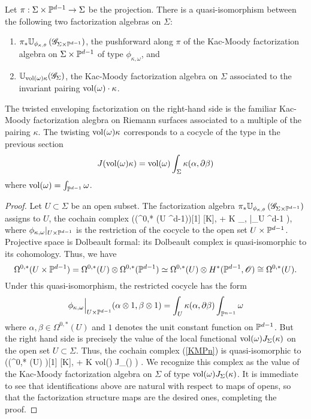 \begin{prop}
Let $\pi : \Sigma \times \mathbb P^{d-1} \to \Sigma$ be the projection. 
There is a quasi-isomorphism between the following two factorization algebras on $\Sigma$:
\begin{enumerate}
\item $\pi_* \mathbb U_{\phi_{\kappa, \theta}} \left(\mathscr G_{\Sigma \times \mathbb P^{d-1}}\right)$, the pushforward along $\pi$ of the Kac-Moody factorization algebra on $\Sigma \times \mathbb P^{d-1}$ of type $\phi_{\kappa,\omega}$, and
\item $\mathbb U_{{\rm vol}(\omega) \kappa} (\mathscr G_\Sigma)$, the Kac-Moody factorization algebra on $\Sigma$ associated to the invariant pairing ${\rm vol}(\omega) \cdot \kappa$. 
\end{enumerate}
\end{prop}

The twisted enveloping factorization on the right-hand side is the familiar Kac-Moody factorization alegbra on Riemann surfaces associated to a multiple of the pairing $\kappa$.
The twisting ${\rm vol}(\omega) \kappa$ corresponds to a cocycle of the type in the previous section 
\[
J({\rm vol}(\omega) \kappa) = {\rm vol}(\omega) \int_\Sigma \kappa(\alpha, \partial \beta)
\]
where ${\rm vol}(\omega) = \int_{\mathbb P^{d-1}} \omega$. 

\begin{proof}
Let $U \subset \Sigma$ be an open subset. 
The factorization algebra $\pi_* \mathbb U_{\phi_{\kappa, \theta}} \left(\mathscr G_{\Sigma \times \mathbb P^{d-1}}\right)$ assigns to $U$, the cochain complex
\beqn\label{KMPn}
\left(\Sym \left(\Omega^{0,*} (U \times \PP^{d-1})\right)[1] [K], \dbar + K \phi_{\kappa, \omega}|_{U \times \PP^{d-1}} \right),
\eeqn
where $\phi_{\kappa, \omega}|_{U \times \mathbb P^{d-1}}$ is the restriction of the cocycle to the open set $U \times \mathbb P^{d-1}$. 
Projective space is Dolbeault formal: its Dolbeault complex is quasi-isomorphic to its cohomology.
Thus, we have 
\[
\Omega^{0,*} (U \times \mathbb P^{d-1}) = \Omega^{0,*}(U) \otimes \Omega^{0,*}(\mathbb P^{d-1}) \simeq \Omega^{0,*}(U) \otimes H^*(\mathbb P^{d-1}, \mathscr O) \cong \Omega^{0,*}(U) .
\]
Under this quasi-isomorphism, the restricted cocycle has the form
\[
\phi_{\kappa,\omega}\Big|_{U \times \mathbb P^{d-1}} (\alpha \otimes 1, \beta \otimes 1) = \int_{U} \kappa(\alpha, \partial \beta) \int_{\mathbb P^{n-1}} \omega 
\]
where $\alpha,\beta \in \Omega^{0,*} (U)$ and $1$ denotes the unit constant function on $\mathbb P^{d-1}$. 
But the right hand side is precisely the value of the local functional ${\rm vol}(\omega) J_\Sigma (\kappa)$ on the open set $U \subset \Sigma$. 
Thus, the cochain complex (\ref{KMPn}) is quasi-isomorphic to 
\beqn
\left(\Sym \left(\Omega^{0,*} (U) \right)[1] [K], \dbar + K {\rm vol}(\omega) J_\Sigma (\kappa) \right) .
\eeqn
We recognize this complex as the value of the Kac-Moody factorization algebra on $\Sigma$ of type ${\rm vol}(\omega) J_\Sigma (\kappa)$.
It is immediate to see that identifications above are natural with respect to maps of opens, so that the factorization structure maps are the desired ones,
completing the proof. 
\end{proof}

